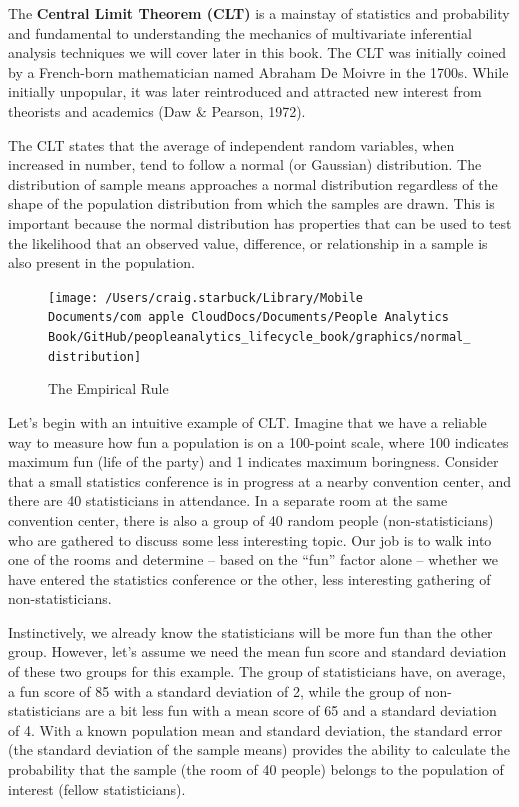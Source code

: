\documentclass[]{book}
\begin{document}
The \textbf{Central Limit Theorem (CLT)} is a mainstay of statistics and probability and fundamental to understanding the mechanics of multivariate inferential analysis techniques we will cover later in this book. The CLT was initially coined by a French-born mathematician named Abraham De Moivre in the 1700s. While initially unpopular, it was later reintroduced and attracted new interest from theorists and academics (Daw \& Pearson, 1972).

The CLT states that the average of independent random variables, when increased in number, tend to follow a normal (or Gaussian) distribution. The distribution of sample means approaches a normal distribution regardless of the shape of the population distribution from which the samples are drawn. This is important because the normal distribution has properties that can be used to test the likelihood that an observed value, difference, or relationship in a sample is also present in the population.

\begin{figure}

{\centering \texttt{[image: /Users/craig.starbuck/Library/Mobile Documents/com~apple~CloudDocs/Documents/People Analytics Book/GitHub/peopleanalytics\_lifecycle\_book/graphics/normal\_distribution]} 

}

\caption{The Empirical Rule}\label{fig:emp-rule}
\end{figure}

Let's begin with an intuitive example of CLT. Imagine that we have a reliable way to measure how fun a population is on a 100-point scale, where 100 indicates maximum fun (life of the party) and 1 indicates maximum boringness. Consider that a small statistics conference is in progress at a nearby convention center, and there are 40 statisticians in attendance. In a separate room at the same convention center, there is also a group of 40 random people (non-statisticians) who are gathered to discuss some less interesting topic. Our job is to walk into one of the rooms and determine -- based on the ``fun'' factor alone -- whether we have entered the statistics conference or the other, less interesting gathering of non-statisticians.

Instinctively, we already know the statisticians will be more fun than the other group. However, let's assume we need the mean fun score and standard deviation of these two groups for this example. The group of statisticians have, on average, a fun score of 85 with a standard deviation of 2, while the group of non-statisticians are a bit less fun with a mean score of 65 and a standard deviation of 4. With a known population mean and standard deviation, the standard error (the standard deviation of the sample means) provides the ability to calculate the probability that the sample (the room of 40 people) belongs to the population of interest (fellow statisticians).
\end{document}
